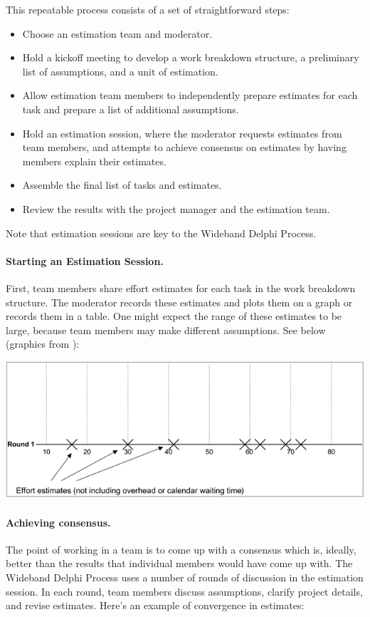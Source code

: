 This repeatable process consists of a set of straightforward steps:
\begin{itemize}
\item Choose an estimation team and moderator.
\item Hold a kickoff meeting to develop a work breakdown structure, a preliminary list of assumptions, and a unit of estimation.
\item Allow estimation team members to independently prepare estimates for each task and prepare a list of additional assumptions.
\item Hold an estimation session, where the moderator requests estimates from team members, and attempts to achieve consensus on estimates by having members explain their estimates.
\item Assemble the final list of tasks and estimates.
\item Review the results with the project manager and the estimation team.
\end{itemize}
Note that estimation sessions are key to the Wideband Delphi Process.

\paragraph{Starting an Estimation Session.}
First, team members share effort estimates for each task in the work
breakdown structure. The moderator records these estimates and plots
them on a graph or records them in a table. One might expect the
range of these estimates to be large, because team members may make
different assumptions. See below (graphics from \cite{aswpm}):

\includegraphics[width=\textwidth]{images/effort-estimates.png}

\paragraph{Achieving consensus.} The point of working in a team is
to come up with a consensus which is, ideally, better than the results
that individual members would have come up with. The Wideband Delphi 
Process uses a number of rounds of discussion in the estimation session.
In each round, team members discuss assumptions, clarify
project details, and revise estimates. Here's an example of convergence
in estimates:

